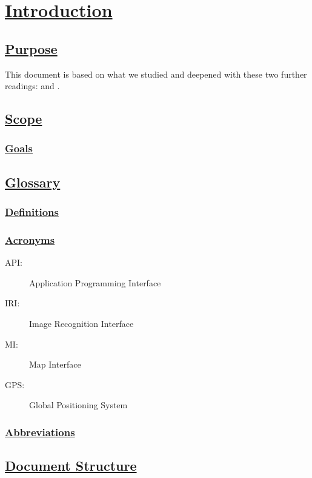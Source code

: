 \section[Introduction]{\hyperlink{toc}{Introduction}}
\subsection[Purpose]{\hyperlink{toc}{Purpose}}
This document is based on what we studied and deepened with these two further readings: \cite{IEEErasd} and \cite{IEEEre}.

\subsection[Scope]{\hyperlink{toc}{Scope}}
	\subsubsection[Goals]{\hyperlink{toc}{Goals}}
	\label{sec:goals}

\subsection[Glossary]{\hyperlink{toc}{Glossary}}
	\subsubsection[Definitions]{\hyperlink{toc}{Definitions}}
	\subsubsection[Acronyms]{\hyperlink{toc}{Acronyms}}
		\begin{description}
			\item[API:] Application Programming Interface
			\item[IRI:] Image Recognition Interface
			\item[MI:] Map Interface
			\item [GPS:] Global Positioning System
		\end{description}
	\subsubsection[Abbreviations]{\hyperlink{toc}{Abbreviations}}
	
		
\subsection[Document Structure]{\hyperlink{toc}{Document Structure}}	

